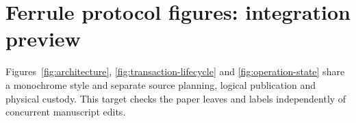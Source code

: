 \documentclass[11pt,letterpaper]{article}
\begin{document}
\section*{Ferrule protocol figures: integration preview}
Figures~\ref{fig:architecture}, \ref{fig:transaction-lifecycle} and
\ref{fig:operation-state} share a monochrome style and separate source planning,
logical publication and physical custody. This target checks the paper leaves
and labels independently of concurrent manuscript edits.

\end{document}
